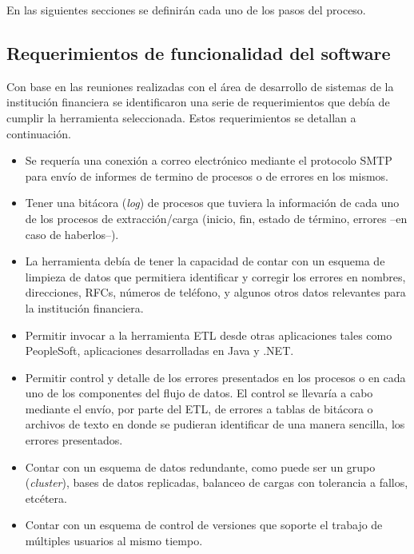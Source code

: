 En las siguientes secciones se definirán cada uno de los pasos del proceso.

\subsection{Requerimientos de funcionalidad del software}

Con base en las reuniones realizadas con el área de desarrollo de sistemas de la
institución financiera se identificaron una serie de requerimientos que debía de
cumplir la herramienta seleccionada.  Estos requerimientos se detallan a
continuación.

\begin{itemize}

\item Se requería una conexión a correo electrónico mediante el protocolo SMTP
  para envío de informes de termino de procesos o de errores en los mismos.

\item Tener una bitácora (\emph{log}) de procesos que tuviera la información de
  cada uno de los procesos de extracción/carga (inicio, fin, estado de término,
  errores --en caso de haberlos--).

\item La herramienta debía de tener la capacidad de contar con un esquema de
  limpieza de datos que permitiera identificar y corregir los errores en
  nombres, direcciones, RFCs, números de teléfono, y algunos otros datos
  relevantes para la institución financiera.

\item Permitir invocar a la herramienta ETL desde otras aplicaciones tales como
  PeopleSoft, aplicaciones desarrolladas en Java y .NET.

\item Permitir control y detalle de los errores presentados en los procesos o en
  cada uno de los componentes del flujo de datos. El control se llevaría a cabo
  mediante el envío, por parte del ETL, de errores a tablas de bitácora o
  archivos de texto en donde se pudieran identificar de una manera sencilla, los
  errores presentados.

\item Contar con un esquema de datos redundante, como puede ser un grupo
  (\emph{cluster}), bases de datos replicadas, balanceo de cargas con tolerancia
  a fallos, etcétera.

\item Contar con un esquema de control de versiones que soporte el trabajo de
  múltiples usuarios al mismo tiempo.


\end{itemize}
